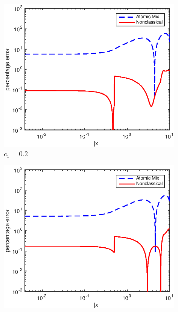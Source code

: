 \documentclass[12pt]{article}
\begin{document}
{\begin{figure}[p]
\begin{subfigure}{0.495\textwidth}
        \label{figerrF10}
    \end{subfigure}
    \\
    \centering
    \begin{subfigure}{0.495\textwidth}
        \centering
        \includegraphics[width=\textwidth]{NSE_err_F20.eps}
        \caption{$c_1 = 0.2$}
        \label{figerrF20}
    \end{subfigure}
    \hfill
    \begin{subfigure}{0.495\textwidth}
        \centering
        \includegraphics[width=\textwidth]{NSE_err_F30.eps}

\end{subfigure}
\end{figure}}
\end{document}
